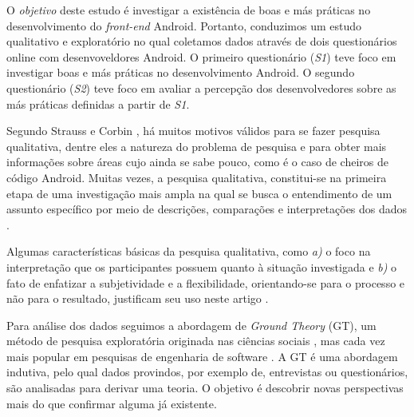 O \emph{objetivo} deste estudo é investigar a existência de boas e más práticas no desenvolvimento do \textit{front-end} Android. Portanto, conduzimos um estudo qualitativo e exploratório no qual coletamos dados através de dois questionários online com desenvoveldores Android. O primeiro questionário (\textit{S1}) teve foco em investigar boas e más práticas no desenvolvimento Android. O segundo questionário (\textit{S2}) teve foco em avaliar a percepção dos desenvolvedores sobre as más práticas definidas a partir de \textit{S1}. 

Segundo Strauss e Corbin \cite{Strauss2007}, há muitos motivos válidos para se fazer pesquisa qualitativa, dentre eles a natureza do problema de pesquisa e para obter mais informações sobre áreas cujo ainda se sabe pouco, como é o caso de cheiros de código Android. Muitas vezes, a pesquisa qualitativa, constitui-se na primeira etapa de uma investigação mais ampla na qual se busca o entendimento de um assunto específico por meio de descrições, comparações e interpretações dos dados \cite{Prikladnicki, Prates2015}.


Algumas características básicas da pesquisa qualitativa, como \textit{a)} o foco na interpretação que os participantes possuem quanto à situação investigada e \textit{b)} o fato de enfatizar a subjetividade e a flexibilidade, orientando-se para o processo e não para o resultado, justificam seu uso neste artigo \cite{Prates2015, King1994}.

Para análise dos dados seguimos a abordagem de \textit{Ground Theory} (GT), um método de pesquisa exploratória originada nas ciências sociais \cite{Strauss2007, GlaserStrauss1999}, mas cada vez mais popular em pesquisas de engenharia de software \cite{Adolph2011}. A GT é uma abordagem indutiva, pelo qual dados provindos, por exemplo de, entrevistas ou questionários, são analisadas para derivar uma teoria. O objetivo é descobrir novas perspectivas mais do que confirmar alguma já existente.

